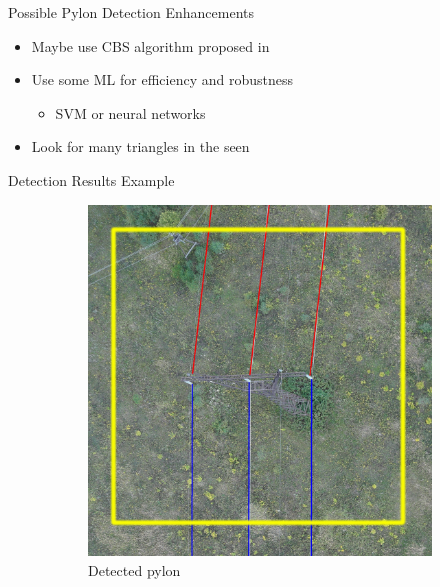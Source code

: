 \documentclass{beamer}
\begin{document}
\begin{frame}[t, fragile]{Possible Pylon Detection Enhancements}
\begin{itemize}
\item Maybe use CBS algorithm proposed in \rbrack
\item Use some ML for efficiency and robustness
\begin{itemize} 
\item SVM or neural networks
\end{itemize}
\item Look for many triangles in the seen
\end{itemize}
\end{frame}


\begin{frame}[t, fragile]{Detection Results Example}
\begin{figure}
\centering
\begin{subfigure}{.5\textwidth}
\centering
\includegraphics[scale=0.07]{intersection1}
\caption{Detected pylon}
\end{subfigure}%
\begin{subfigure}{.5\textwidth}

\end{subfigure}
\end{figure}
\end{frame}
\end{document}

